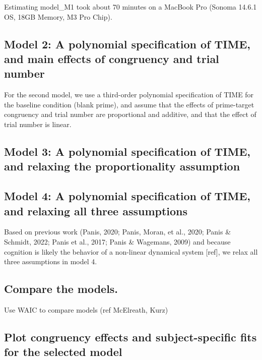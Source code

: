 \documentclass[
  man,floatsintext]{apa6}
\begin{document}
\normalsize

Estimating model\_M1 took about 70 minutes on a MacBook Pro (Sonoma 14.6.1 OS, 18GB Memory, M3 Pro Chip).

\subsection{Model 2: A polynomial specification of TIME, and main effects of congruency and trial number}\label{model-2-a-polynomial-specification-of-time-and-main-effects-of-congruency-and-trial-number}

For the second model, we use a third-order polynomial specification of TIME for the baseline condition (blank prime), and assume that the effects of prime-target congruency and trial number are proportional and additive, and that the effect of trial number is linear.

\subsection{Model 3: A polynomial specification of TIME, and relaxing the proportionality assumption}\label{model-3-a-polynomial-specification-of-time-and-relaxing-the-proportionality-assumption}

\subsection{Model 4: A polynomial specification of TIME, and relaxing all three assumptions}\label{model-4-a-polynomial-specification-of-time-and-relaxing-all-three-assumptions}

Based on previous work (Panis, 2020; Panis, Moran, et al., 2020; Panis \& Schmidt, 2022; Panis et al., 2017; Panis \& Wagemans, 2009) and because cognition is likely the behavior of a non-linear dynamical system {[}ref{]}, we relax all three assumptions in model 4.

\subsection{Compare the models.}\label{compare-the-models.}

Use WAIC to compare models (ref McElreath, Kurz)

\subsection{Plot congruency effects and subject-specific fits for the selected model}\label{plot-congruency-effects-and-subject-specific-fits-for-the-selected-model}
\end{document}
